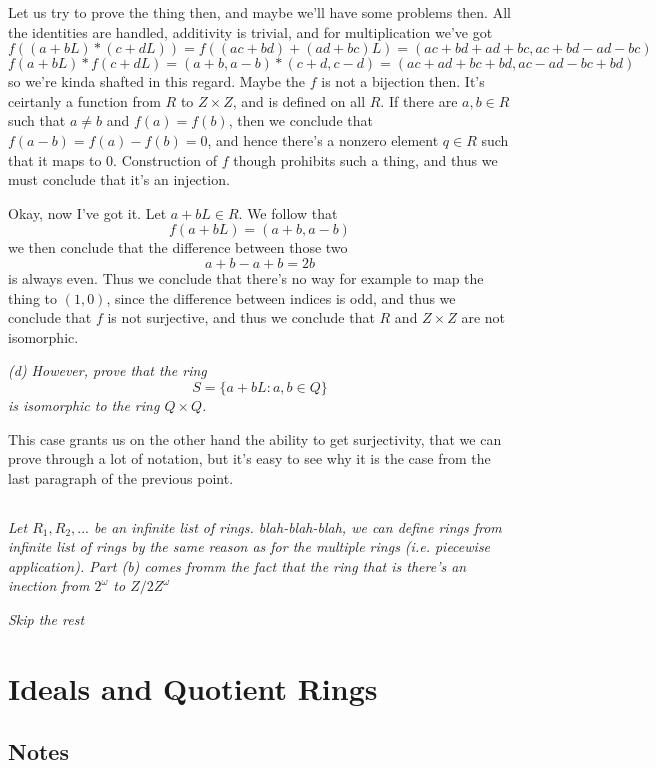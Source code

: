 \documentclass[11pt,oneside,titlepage]{book}
\newcommand{\set}[1]{\{ #1 \}}
\begin{document}
Let us try to prove the thing then, and maybe we'll have some problems
then. All the identities are handled, additivity is trivial, and for
multiplication we've got
$$f((a + bL) * (c + dL)) = f((ac + bd) + (ad + bc)L)
= (ac + bd + ad + bc, ac + bd - ad - bc)$$
$$f(a + bL) * f(c + dL) = (a + b, a - b) * (c + d, c - d)
= (ac + ad + bc + bd, ac - ad - bc + bd)$$
so we're kinda shafted in this regard. Maybe the $f$ is not a
bijection then. It's ceirtanly a function from $R$ to $Z \times Z$,
and is defined on all $R$. If there are $a, b \in R$ such that $a \neq
b$ and $f(a) = f(b)$, then we conclude that $f(a - b) = f(a) - f(b) =
0$, and hence there's a nonzero element $q \in R$ such that it maps to
$0$. Construction of $f$ though prohibits such a thing, and thus we
must conclude that it's an injection.

Okay, now I've got it. Let $a + bL \in R$. We follow that
$$f(a + bL) = (a + b, a - b)$$
we then conclude that the difference between those two
$$a + b - a + b = 2b$$
is always even. Thus we conclude that there's no way for example to
map the thing to $(1, 0)$, since the difference between indices is odd,
and thus we conclude that $f$ is not surjective, and thus we conclude that
$R$ and $Z \times Z$ are not isomorphic. 

\textit{(d) However, prove that the ring
  $$S = \set{a + bL: a, b \in Q}$$
  is isomorphic to the ring $Q \times Q$.
}

This case grants us on the other hand the ability to get surjectivity,
that we can prove through a lot of notation, but it's easy to see why
it is the case from the last paragraph of the previous point.

\subsection{}

\textit{Let $R_1, R_2, ...$ be an infinite list of
rings. blah-blah-blah, we can define rings from infinite list of rings
by the same reason as for the multiple rings (i.e. piecewise
application). Part (b) comes fromm the fact that the ring that is
there's an inection from $2^\omega$ to $Z/2Z^\omega$}

\textit{Skip the rest}

\section{Ideals and Quotient Rings}

\subsection*{Notes}
\end{document}
